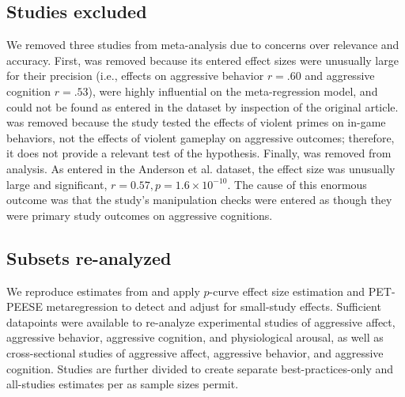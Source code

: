 \documentclass[man]{apa6}
\begin{document}
\subsection{Studies excluded}
We removed three studies from meta-analysis due to concerns over relevance and accuracy. First, \citet[study 1]{Matsuzaki:etal:2004} was removed because its entered effect sizes were unusually large for their precision (i.e., effects on aggressive behavior $r = .60$ and aggressive cognition $r = .53$), were highly influential on the meta-regression model, and could not be found as entered in the \citet{Anderson:etal:2010} dataset by inspection of the original article.%
\citet{Panee:Ballard:2002} was removed because the study tested the effects of violent primes on in-game behaviors, not the effects of violent gameplay on aggressive outcomes; therefore, it does not provide a relevant test of the hypothesis. 
Finally, \citet{Graybill:etal:1985} was removed from analysis. As entered in the Anderson et al. dataset, the effect size was unusually large and significant, $r = 0.57, p = 1.6 \times 10^{-10}$. The cause of this enormous outcome was that the study's manipulation checks were entered as though they were primary study outcomes on aggressive cognitions. %

\subsection{Subsets re-analyzed}
We reproduce estimates from \citet{Anderson:etal:2010} and apply $p$-curve effect size estimation and PET-PEESE metaregression to detect and adjust for small-study effects. Sufficient datapoints were available to re-analyze experimental studies of aggressive affect, aggressive behavior, aggressive cognition, and physiological arousal, as well as cross-sectional studies of aggressive affect, aggressive behavior, and aggressive cognition. Studies are further divided to create separate best-practices-only and all-studies estimates per \citet{Anderson:etal:2010} as sample sizes permit. 
\end{document}

